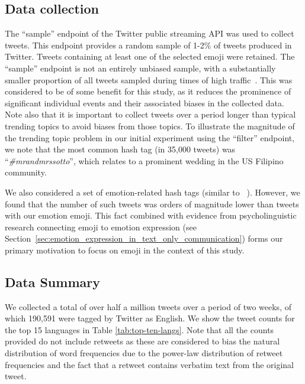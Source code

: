 \documentclass[10pt, a4paper]{article}
\begin{document}
\subsection{Data collection}

The ``sample'' endpoint of the Twitter public streaming API was used to collect tweets. This endpoint provides a random sample of 1-2\% of tweets produced in Twitter.
Tweets containing at least one of the selected emoji were retained. 
The ``sample'' endpoint is not an entirely unbiased sample, with a substantially smaller proportion of all tweets sampled during times of high traffic~\cite{Morstatter2013Is}. This was considered to be of some benefit for this study, as it reduces the prominence of significant individual events and their associated biases in the collected data.
Note also that it is important to collect tweets over a period longer than typical trending topics to avoid biases from those topics.
To illustrate the magnitude of the trending topic problem in our initial experiment using the ``filter'' endpoint, we note that the most common hash tag (in 35,000 tweets) was ``\emph{\#mrandmrssotto}'', which relates to a prominent wedding in the US Filipino community.

We also considered a set of emotion-related hash tags (similar to ~\cite{Mohammad2012Emotional}). However, we found that the number of such tweets was orders of magnitude lower than tweets with our emotion emoji. This fact combined with evidence from psycholinguistic research connecting emoji to emotion expression (see Section~\ref{sec:emotion_expression_in_text_only_communication}) forms our primary motivation to focus on emoji in the context of this study.

\subsection{Data Summary}
We collected a total of over half a million tweets over a period of two weeks, of which 190,591 were tagged by Twitter as English. We show the tweet counts for the top 15 languages in Table \ref{tab:top-ten-langs}.
Note that all the counts provided do not include retweets as 
these are considered to bias the natural distribution of word frequencies due to the power-law distribution of retweet frequencies and the fact that a retweet contains verbatim text from the original tweet.
\end{document}
